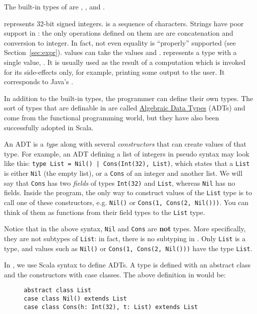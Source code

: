 The built-in types of \langname are , ,  and .

 represents 32-bit signed integers.
 is a sequence of characters. Strings have poor support in \langname:
the only operations defined on them are are concatenation and conversion to integer.
In fact, not even equality is ``properly'' supported (see Section~\ref{sec:expr}). 
 values can take the values  and .
 represents a type with a single value, \gtns{()}.
It is usually used as the result of a computation which is invoked for its side-effects only,
for example, printing some output to the user.
It corresponds to Java's .

In addition to the built-in types, the programmer can define their own types.
The sort of types that are definable in \langname are called
\href{https://en.wikipedia.org/wiki/Algebraic_data_type}{Algebraic Data Types} (ADTs)
and come from the functional programming world,
but they have also been successfully adopted in Scala.

An ADT is a \emph{type} along with several \emph{constructors} that can create
values of that type. For example, an ADT defining a list of integers
in pseudo syntax may look like this:
\lstinline{type List = Nil() | Cons(Int(32), List)},
which states that a \lstinline{List} is either \lstinline{Nil} (the empty list),
or a \lstinline{Cons} of an integer and another list.
We will say that \lstinline{Cons} has two \emph{fields} of types \lstinline{Int(32)} and \lstinline{List},
whereas \lstinline{Nil} has no fields.
Inside the program, the only way to construct values of the \lstinline{List} type
is to call one of these constructors, e.g. \lstinline{Nil()} or \lstinline{Cons(1, Cons(2, Nil()))}.
You can think of them as functions from their field types to the \lstinline{List} type.

Notice that in the above syntax, \lstinline{Nil} and \lstinline{Cons}
are \textbf{not} types. More specifically, they are not subtypes of \lstinline{List}:
in fact, there is no subtyping in \langname.
Only \lstinline{List} is a type, and values such as \lstinline{Nil()} or \lstinline{Cons(1, Cons(2, Nil()))}
have the type \lstinline{List}.

In \langname, we use Scala syntax to define ADTs.
A type is defined with an abstract class and the constructors with case classes.
The above definition in \langname would be:
\begin{figure}[h]
\begin{lstlisting}
abstract class List
case class Nil() extends List
case class Cons(h: Int(32), t: List) extends List
\end{lstlisting}
\end{figure}

